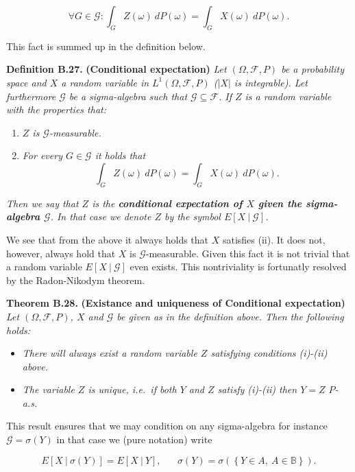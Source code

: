 \documentclass[
]{article}
\providecommand{\tightlist}{%
  \setlength{\itemsep}{0pt}\setlength{\parskip}{0pt}}
\begin{document}
\[
\forall G\in\mathcal{G} : \int_G Z(\omega)\ dP(\omega)=\int_G X(\omega)\ dP(\omega).
\]

This fact is summed up in the definition below.

\textbf{Definition B.27.} \textbf{(Conditional expectation)} \emph{Let
\((\Omega,\mathcal{F},P)\) be a probability space and \(X\) a random
variable in \(L^1(\Omega,\mathcal{F},P)\) (\(\vert X\vert\) is
integrable). Let furthermore \(\mathcal{G}\) be a sigma-algebra such
that \(\mathcal{G}\subseteq \mathcal{F}\). If \(Z\) is a random variable
with the properties that:}

\begin{enumerate}
\def\labelenumi{\roman{enumi}.}
\tightlist
\item
  \emph{\(Z\) is \(\mathcal{G}\)-measurable.}
\item
  \emph{For every \(G\in\mathcal{G}\) it holds that}
  \[\int_G Z(\omega)\ dP(\omega)=\int_G X(\omega)\ dP(\omega).\tag{B.5}\]
\end{enumerate}

\emph{Then we say that \(Z\) is the \textbf{conditional expectation of
\(X\) given the sigma-algebra \(\mathcal{G}\)}. In that case we denote
\(Z\) by the symbol \(E[X\ \vert\ \mathcal{G}]\).}

We see that from the above it always holds that \(X\) satisfies (ii). It
does not, however, always hold that \(X\) is \(\mathcal{G}\)-measurable.
Given this fact it is not trivial that a random variable
\(E[X\ \vert\ \mathcal{G}]\) even exists. This nontriviality is
fortunatly resolved by the Radon-Nikodym theorem.

\textbf{Theorem B.28.} \textbf{(Existance and uniqueness of Conditional
expectation)} \emph{Let \((\Omega,\mathcal{F},P)\), \(X\) and
\(\mathcal{G}\) be given as in the definition above. Then the following
holds:}

\begin{itemize}
\tightlist
\item
  \emph{There will always exist a random variable \(Z\) satisfying
  conditions (i)-(ii) above.}
\item
  \emph{The variable \(Z\) is unique, i.e.~if both \(Y\) and \(Z\)
  satisfy (i)-(ii) then \(Y=Z\) \(P\)-a.s.}
\end{itemize}

This result ensures that we may condition on any sigma-algebra for
instance \(\mathcal{G}=\sigma(Y)\) in that case we (pure notation) write

\[
E[X\ \vert\ \sigma(Y)]=E[X\ \vert\ Y],\hspace{20pt}\sigma(Y)=\sigma\left(\left\{ Y\in A,\ A\in\mathbb{B}\right\}\right).
\]
\end{document}
